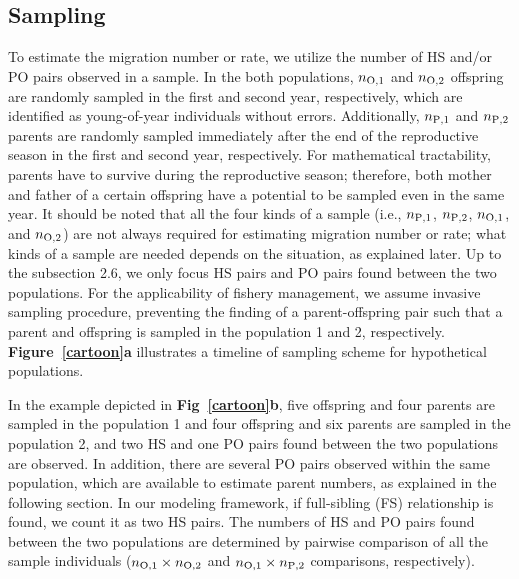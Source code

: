 \documentclass[12pt, English]{article}
\begin{document}
\begin{spacing}{1.9}
\begin{center}
\end{center}

\subsection{Sampling}

To estimate the migration number or rate, we utilize the number of HS and/or PO pairs observed in a sample. In the both populations, $n_{\rm O, 1}$ and $n_{\rm O, 2}$ offspring are randomly sampled in the first and second year, respectively, which are identified as young-of-year individuals without errors. Additionally, $n_{\rm P, 1}$ and $n_{\rm P, 2}$ parents are randomly sampled immediately after the end of the reproductive season in the first and second year, respectively. For mathematical tractability, parents have to survive during the reproductive season; therefore, both mother and father of a certain offspring have a potential to be sampled even in the same year. It should be noted that all the four kinds of a sample (i.e., $n_{\rm P, 1}$, $n_{\rm P, 2}$, $n_{\rm O, 1}$, and $n_{\rm O, 2}$) are not always required for estimating migration number or rate; what kinds of a sample are needed depends on the situation, as explained later. Up to the subsection 2.6, we only focus HS pairs and PO pairs found between the two populations. For the applicability of fishery management, we assume invasive sampling procedure, preventing the finding of a parent-offspring pair such that a parent and offspring is sampled in the population 1 and 2, respectively. {\bf Figure~\ref{cartoon}a} illustrates a timeline of sampling scheme for hypothetical populations. 

In the example depicted in {\bf Fig~\ref{cartoon}b}, five offspring and four parents are sampled in the population 1 and four offspring and six parents are sampled in the population 2, and two HS and one PO pairs found between the two populations are observed. In addition, there are several PO pairs observed within the same population, which are available to estimate parent numbers, as explained in the following section. In our modeling framework, if full-sibling (FS) relationship is found, we count it as two HS pairs. The numbers of HS and PO pairs found between the two populations are determined by pairwise comparison of all the sample individuals ($n_{\rm O,1}\times n_{\rm O,2}$ and $n_{\rm O,1}\times n_{\rm P,2}$ comparisons, respectively). 


\end{spacing}
\end{document}
